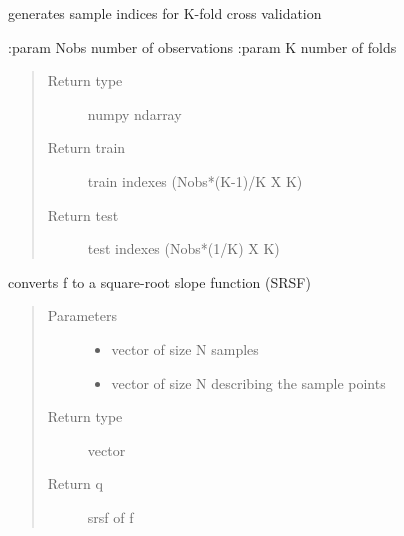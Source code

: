 \documentclass[letterpaper,10pt,english]{sphinxmanual}
\begin{document}
\begin{fulllineitems}
\label{\detokenize{utility_functions:utility_functions.f_K_fold}}
generates sample indices for K-fold cross validation

:param Nobs number of observations
:param K number of folds
\begin{quote}\begin{description}
\item[{Return type}] \leavevmode
numpy ndarray

\item[{Return train}] \leavevmode
train indexes (Nobs*(K-1)/K X K)

\item[{Return test}] \leavevmode
test indexes (Nobs*(1/K) X K)

\end{description}\end{quote}

\end{fulllineitems}


\begin{fulllineitems}
\label{\detokenize{utility_functions:utility_functions.f_to_srsf}}
converts f to a square-root slope function (SRSF)
\begin{quote}\begin{description}
\item[{Parameters}] \leavevmode\begin{itemize}
\item {} 
 \textendash{} vector of size N samples

\item {} 
 \textendash{} vector of size N describing the sample points

\end{itemize}

\item[{Return type}] \leavevmode
vector

\item[{Return q}] \leavevmode
srsf of f

\end{description}\end{quote}

\end{fulllineitems}
\end{document}
